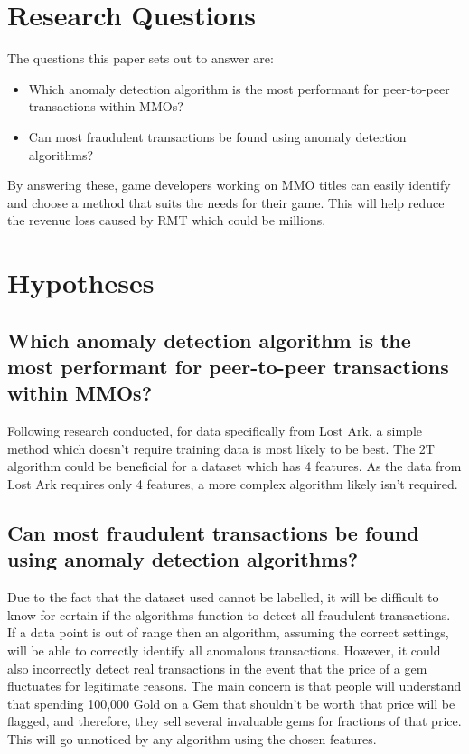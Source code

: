 \documentclass[journal]{IEEEtran}
\begin{document}
\section{Research Questions}
\noindent The questions this paper sets out to answer are:
\begin{itemize}
    \item Which anomaly detection algorithm is the most performant for peer-to-peer transactions within MMOs?
    \item Can most fraudulent transactions be found using anomaly detection algorithms?
\end{itemize}

By answering these, game developers working on MMO titles can easily identify and choose a method that suits the needs for their game. This will help reduce the revenue loss caused by RMT which could be millions\cite{Dibbell2007}.

\section{Hypotheses}
\subsection{Which anomaly detection algorithm is the most performant for peer-to-peer transactions within MMOs?}
\noindent Following research conducted, for data specifically from Lost Ark, a simple method which doesn't require training data is most likely to be best. The 2T algorithm\cite{Yang2019} could be beneficial for a dataset which has 4 features. As the data from Lost Ark requires only 4 features, a more complex algorithm likely isn't required. 

\subsection{Can most fraudulent transactions be found using anomaly detection algorithms?}
\noindent Due to the fact that the dataset used cannot be labelled, it will be difficult to know for certain if the algorithms function to detect all fraudulent transactions. If a data point is out of range then an algorithm, assuming the correct settings, will be able to correctly identify all anomalous transactions. However, it could also incorrectly detect real transactions in the event that the price of a gem fluctuates for legitimate reasons. The main concern is that people will understand that spending 100,000 Gold on a Gem that shouldn't be worth that price will be flagged, and therefore, they sell several invaluable gems for fractions of that price. This will go unnoticed by any algorithm using the chosen features.
\end{document}
